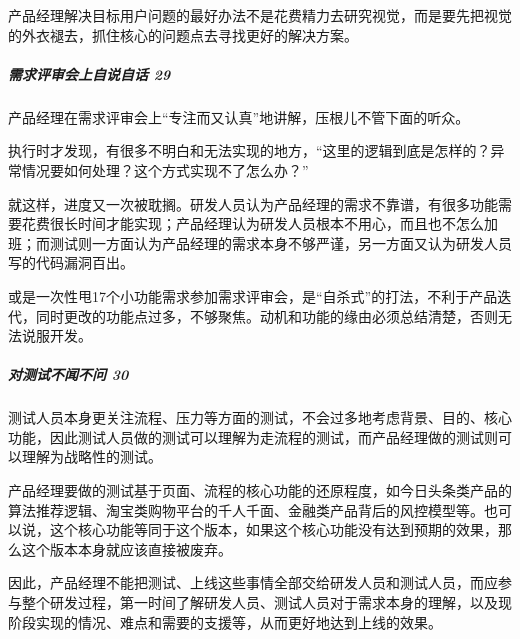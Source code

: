 \documentclass[letterpaper,11pt,english]{sphinxmanual}
\begin{document}
产品经理解决目标用户问题的最好办法不是花费精力去研究视觉，而是要先把视觉的外衣褪去，抓住核心的问题点去寻找更好的解决方案。


\subparagraph{需求评审会上自说自话 29\sphinxfootnotemark[137]}
\label{\detokenize{chapter_introduction/PM:id12}}%
\begin{footnotetext}[137]\sphinxAtStartFootnote
{}
%
\end{footnotetext}\ignorespaces 
产品经理在需求评审会上“专注而又认真”地讲解，压根儿不管下面的听众。

执行时才发现，有很多不明白和无法实现的地方，“这里的逻辑到底是怎样的？异常情况要如何处理？这个方式实现不了怎么办？”

就这样，进度又一次被耽搁。研发人员认为产品经理的需求不靠谱，有很多功能需要花费很长时间才能实现；产品经理认为研发人员根本不用心，而且也不怎么加班；而测试则一方面认为产品经理的需求本身不够严谨，另一方面又认为研发人员写的代码漏洞百出。

或是一次性甩17个小功能需求参加需求评审会，是“自杀式”的打法，不利于产品迭代，同时更改的功能点过多，不够聚焦。动机和功能的缘由必须总结清楚，否则无法说服开发。%
\begin{footnote}[138]\sphinxAtStartFootnote
{}
%
\end{footnote}


\subparagraph{对测试不闻不问 30\sphinxfootnotemark[139]}
\label{\detokenize{chapter_introduction/PM:id13}}%
\begin{footnotetext}[139]\sphinxAtStartFootnote
{}
%
\end{footnotetext}\ignorespaces 
测试人员本身更关注流程、压力等方面的测试，不会过多地考虑背景、目的、核心功能，因此测试人员做的测试可以理解为走流程的测试，而产品经理做的测试则可以理解为战略性的测试。

产品经理要做的测试基于页面、流程的核心功能的还原程度，如今日头条类产品的算法推荐逻辑、淘宝类购物平台的千人千面、金融类产品背后的风控模型等。也可以说，这个核心功能等同于这个版本，如果这个核心功能没有达到预期的效果，那么这个版本本身就应该直接被废弃。

因此，产品经理不能把测试、上线这些事情全部交给研发人员和测试人员，而应参与整个研发过程，第一时间了解研发人员、测试人员对于需求本身的理解，以及现阶段实现的情况、难点和需要的支援等，从而更好地达到上线的效果。
\end{document}

